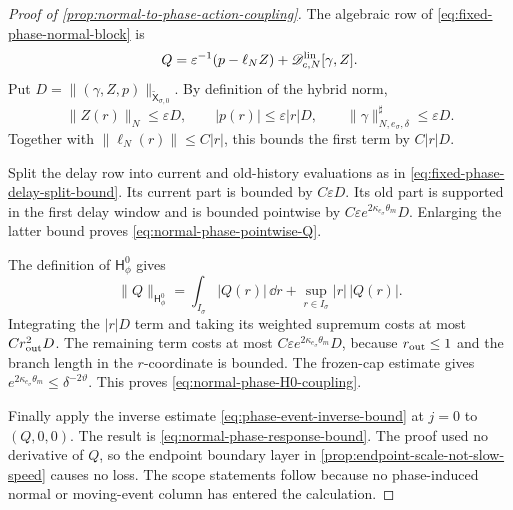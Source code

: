 \begin{proof}[Proof of \cref{prop:normal-to-phase-action-coupling}]
The algebraic row of \cref{eq:fixed-phase-normal-block} is
\begin{equation*}
 Q=\varepsilon^{-1}(p-\ell_NZ)
       +\mathscr D_{c,N}^{\rm lin}[\gamma,Z].
\end{equation*}
Put
\(D=\|(\gamma,Z,p)\|_{\widetilde{\mathsf X}_{\sigma,0}}\).
By definition of the hybrid norm,
\begin{equation*}
 \|Z(r)\|_N\le\varepsilon D,
 \qquad |p(r)|\le\varepsilon|r|D,
 \qquad
 \|\gamma\|_{N,e_\sigma,\delta}^{\sharp}\le\varepsilon D.
\end{equation*}
Together with \(\|\ell_N(r)\|\le C|r|\), this bounds the first term by
\(C|r|D\).

Split the delay row into current and old-history evaluations as in
\cref{eq:fixed-phase-delay-split-bound}.  Its current part is bounded by
\(C\varepsilon D\).  Its old part is supported in the first delay window
and is bounded pointwise by
\(C\varepsilon e^{2\kappa_{e_\sigma}\theta_m}D\).  Enlarging the latter
bound proves \cref{eq:normal-phase-pointwise-Q}.

The definition of \(\mathsf H_\phi^0\) gives
\begin{equation*}
 \|Q\|_{\mathsf H_\phi^0}
 =\int_{I_\sigma}|Q(r)|\,\dd r
       +\sup_{r\in I_\sigma}|r|\,|Q(r)|.
\end{equation*}
Integrating the \(|r|D\) term and taking its weighted supremum costs at
most \(Cr_{\rm out}^2D\).  The remaining term costs at most
\(C\varepsilon e^{2\kappa_{e_\sigma}\theta_m}D\), because
\(r_{\rm out}\le1\) and the branch length in the \(r\)-coordinate is
bounded.  The frozen-cap estimate gives
\(e^{2\kappa_{e_\sigma}\theta_m}\le\delta^{-2\vartheta}\).
This proves \cref{eq:normal-phase-H0-coupling}.

Finally apply the inverse estimate
\cref{eq:phase-event-inverse-bound} at \(j=0\) to \((Q,0,0)\).  The result
is \cref{eq:normal-phase-response-bound}.  The proof used no derivative of
\(Q\), so the endpoint boundary layer in
\cref{prop:endpoint-scale-not-slow-speed} causes no loss.  The scope
statements follow because no phase-induced normal or moving-event column
has entered the calculation.
\end{proof}

